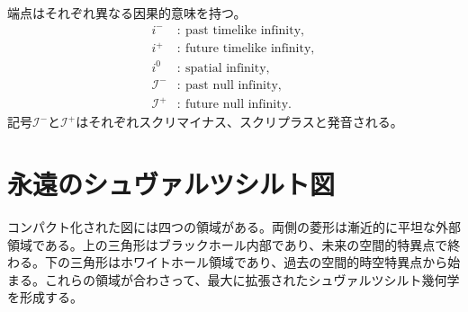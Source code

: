 端点はそれぞれ異なる因果的意味を持つ。
\begin{equation}
\begin{aligned}
i^-&:\ \text{past timelike infinity},\\
i^+&:\ \text{future timelike infinity},\\
i^0&:\ \text{spatial infinity},\\
\mathcal{I}^-&:\ \text{past null infinity},\\
\mathcal{I}^+&:\ \text{future null infinity}.
\end{aligned}
\end{equation}
記号\(\mathcal{I}^{-}\)と\(\mathcal{I}^{+}\)はそれぞれスクリマイナス、スクリプラスと発音される。

\begin{classroomqa}
\end{classroomqa}

\begin{classroomqa}
\end{classroomqa}

\begin{classroomqa}
\end{classroomqa}

\section{永遠のシュヴァルツシルト図}

コンパクト化された図には四つの領域がある。両側の菱形は漸近的に平坦な外部領域である。上の三角形はブラックホール内部であり、未来の空間的特異点で終わる。下の三角形はホワイトホール領域であり、過去の空間的時空特異点から始まる。これらの領域が合わさって、最大に拡張されたシュヴァルツシルト幾何学を形成する。

